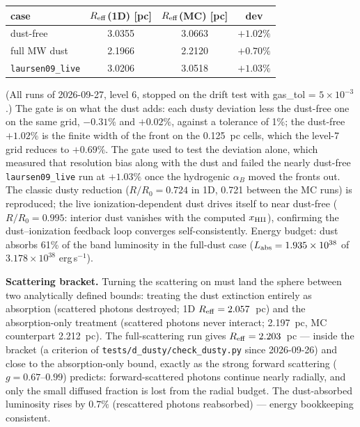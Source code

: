\documentclass[english,a4paper]{my_memo}
\newcommand{\code}[1]{\texttt{#1}}
\begin{document}
\begin{center}
\begin{tabular}{lccc}
\toprule
case & $R_{\rm eff}$(1D) [pc] & $R_{\rm eff}$(MC) [pc] & dev \\
\midrule
dust-free            & 3.0355 & 3.0663 & $+1.02\%$ \\
full MW dust        & 2.1966 & 2.2120 & $+0.70\%$ \\
\code{laursen09\_live} & 3.0206 & 3.0518 & $+1.03\%$ \\
\bottomrule
\end{tabular}
\end{center}
(All runs of 2026-09-27, level 6, stopped on the drift test with gas\_tol = $5\times10^{-3}$.)  The gate is on what the dust adds: each
dusty deviation less the dust-free one on the same grid, $-0.31\%$ and
$+0.02\%$, against a tolerance of 1\%; the dust-free $+1.02\%$ is the
finite width of the front on the 0.125~pc cells, which the level-7 grid
reduces to $+0.69\%$.  The gate used to test the deviation alone, which
measured that resolution bias along with the dust and failed the nearly
dust-free \code{laursen09\_live} run at $+1.03\%$ once the hydrogenic
$\alpha_B$ moved the fronts out.
The classic dusty reduction ($R/R_0 = 0.724$ in 1D, 0.721 between the
MC runs) is reproduced; the live
ionization-dependent dust drives itself to near dust-free
($R/R_0 = 0.995$: interior dust vanishes with the computed
$x_{\rm HII}$), confirming the dust--ionization feedback loop converges
self-consistently.  Energy budget: dust absorbs 61\% of the band
luminosity in the full-dust case
($L_{\rm abs} = 1.935\times10^{38}$ of $3.178\times10^{38}$ erg\,s$^{-1}$).

\textbf{Scattering bracket.}  Turning the scattering on must land the
sphere between two analytically defined bounds: treating the dust
extinction entirely as absorption (scattered photons destroyed; 1D
$R_{\rm eff} = 2.057$~pc) and the absorption-only treatment (scattered
photons never interact; 2.197~pc, MC counterpart 2.212~pc).  The
full-scattering run gives $R_{\rm eff} = 2.203$~pc --- inside the
bracket (a criterion of \code{tests/d\_dusty/check\_dusty.py} since
2026-09-26) and close to the absorption-only bound, exactly as the strong
forward scattering ($g = 0.67$--$0.99$) predicts: forward-scattered
photons continue nearly radially, and only the small diffused fraction
is lost from the radial budget.  The dust-absorbed luminosity rises by
$0.7\%$ (rescattered photons reabsorbed) --- energy bookkeeping
consistent.
\end{document}
